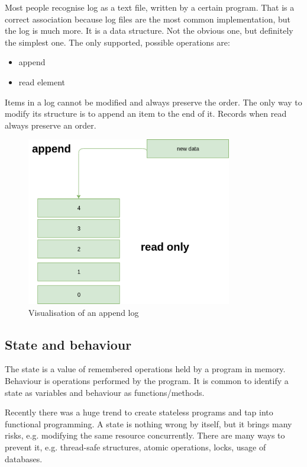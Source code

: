 Most people recognise log as a text file, written by a certain program. That is a correct association because log files are the most common implementation, but the log is much more. It is a data structure. Not the obvious one, but definitely the simplest one. The only supported, possible operations are:
\begin{itemize}
\item append
\item read element
\end{itemize}
Items in a log cannot be modified and always preserve the order. The only way to modify its structure is to append an item to the end of it. Records when read always preserve an order. 

\begin{figure}[h!]
 \centering
  \includegraphics[width=0.8\textwidth]{pictures/log.png}
  \caption{Visualisation of an append log}
  \label{fig:log}
\end{figure}



\subsection{State and behaviour}
\label{subsec:stateAndBehaviour}

The state is a value of remembered operations held by a program in memory. Behaviour is operations performed by the program. It is common to identify a  state as variables and behaviour as functions/methods.

Recently there was a huge trend to create stateless programs and tap into functional programming. A state is nothing wrong by itself, but it brings many risks, e.g. modifying the same resource concurrently. There are many ways to prevent it, e.g. thread-safe structures, atomic operations, locks, usage of databases. 

